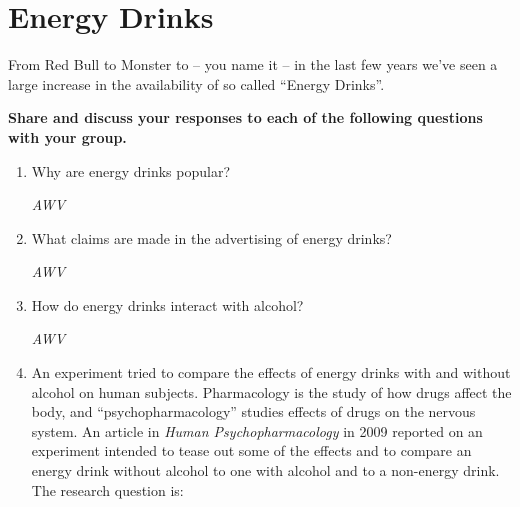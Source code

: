 \def\theTopic{Energy Drinks }
\def\dayNum{14}

\section{ Energy Drinks}

From Red Bull to Monster to -- you name it -- in the last few years
we've seen a large increase in the availability of so called ``Energy
Drinks''. 

{\bf Share and discuss your responses to each of the following
  questions with your group. }
\begin{enumerate}
  \item  Why are energy drinks popular? 
\begin{students}
    \vspace{4cm}    
\end{students}

\begin{key}
  {\it  AWV}
\end{key}

  \item  What claims are made in the advertising of energy drinks?
\begin{students}
     \vspace{5cm}    
\end{students}

\begin{key}
  {\it  AWV }
\end{key}

  \item  How do energy drinks interact with alcohol?
\begin{students}
    \vspace{5cm}    
\end{students}

\begin{key}
  {\it  AWV}
\end{key}

\item An experiment tried to compare the effects of energy drinks with
  and without alcohol on human subjects.  Pharmacology is the study of
  how drugs affect the body, and ``psychopharmacology'' studies
  effects of drugs on the nervous system. An article in {\it Human
    Psychopharmacology} in 2009 reported on an experiment intended to
  tease out some of the effects and to compare an energy drink without
  alcohol to one with alcohol and to a non-energy drink.  The research
  question is:


\end{enumerate}
